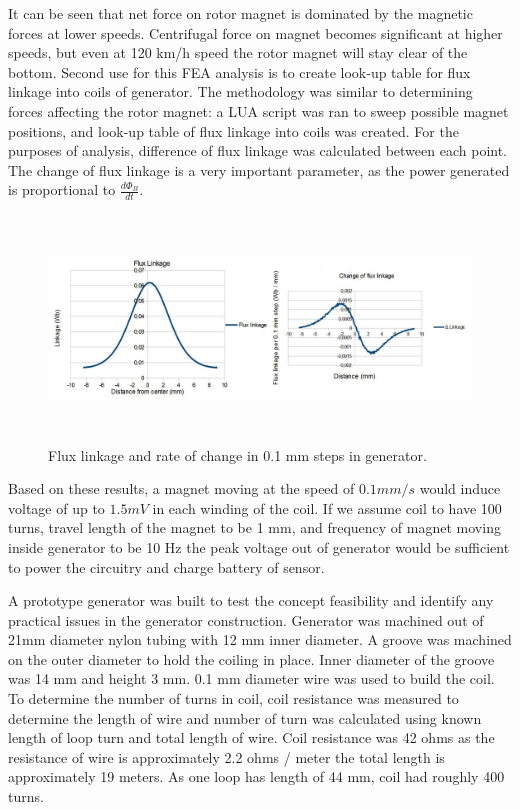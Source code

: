 It can be seen that net force on rotor magnet is dominated by the magnetic forces at lower speeds. Centrifugal force on magnet becomes significant at higher speeds, but even at 120 km/h speed the rotor magnet will stay clear of the bottom. Second use for this FEA analysis is to create look-up table for flux linkage into coils of generator. The methodology was similar to determining forces affecting the rotor magnet: a LUA script was ran to sweep possible magnet positions, and look-up table of flux linkage into coils was created. For the purposes of analysis, difference of flux linkage was calculated between each point. The change of flux linkage is a very important parameter, as the power generated is proportional to $\frac{d \Phi_{B}}{d t}$. 

\begin{figure}[htb]
\begin{center}
\includegraphics[height=6cm]{images/own_dwg/femm_flux_dualmagnet.jpg}
\end{center}
\caption{\label{fig:femm_linkage} Flux linkage and rate of change in 0.1 mm steps in generator.}
\end{figure}

Based on these results, a magnet moving at the speed of $0.1 mm / s $ would induce voltage of up to $1.5 mV$ in each winding of the coil. If we assume coil to have 100 turns, travel length of the magnet to be 1 mm, and frequency of magnet moving inside generator to be 10 Hz the peak voltage out of generator would be sufficient to power the circuitry and charge battery of sensor.

A prototype generator was built to test the concept feasibility and identify any practical issues in the generator construction. Generator was machined out of 21mm diameter nylon tubing with 12 mm inner diameter. A groove was machined on the outer diameter to hold the coiling in place. Inner diameter of the groove was 14 mm and height 3 mm. 0.1 mm diameter wire was used to build the coil. To determine the number of turns in coil, coil resistance was measured to determine the length of wire and number of turn was calculated using known length of loop turn and total length of wire. Coil resistance was 42 ohms as the resistance of wire is approximately 2.2 ohms / meter the total length is approximately 19 meters. As one loop has length of 44 mm, coil had roughly 400 turns. 

